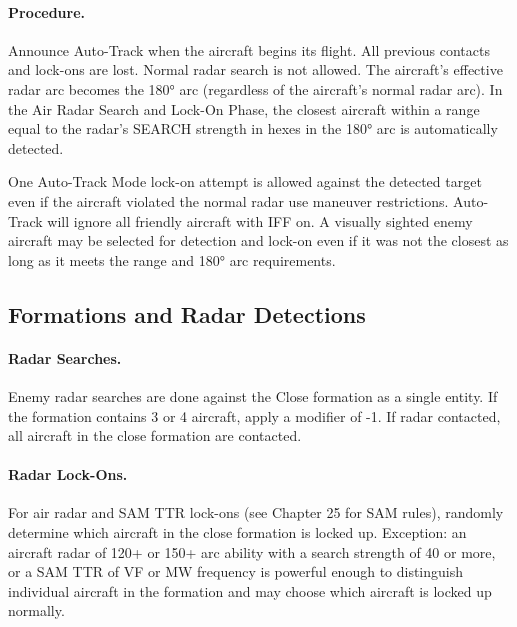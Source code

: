 \paragraph{Procedure.} Announce Auto-Track when the aircraft begins its flight. All previous contacts and lock-ons are lost. Normal radar search is not allowed. The aircraft's effective radar arc becomes the 180° arc (regardless of the aircraft's normal radar arc). In the Air Radar Search and Lock-On Phase, the closest aircraft within a range equal to the radar's SEARCH strength in hexes in the 180° arc is automatically detected.

One Auto-Track Mode lock-on attempt is allowed against the detected target even if the aircraft violated the normal radar use maneuver restrictions. Auto-Track will ignore all friendly aircraft with IFF on. A visually sighted enemy aircraft may be selected for detection and lock-on even if it was not the closest as long as it meets the range and 180° arc requirements. 


\subsection{Formations and Radar Detections}

\paragraph{Radar Searches.} Enemy radar searches are done against the Close formation as a single entity. If the formation contains 3 or 4 aircraft, apply a modifier of -1. If radar contacted, all aircraft in the close formation are contacted.

\paragraph{Radar Lock-Ons.} For air radar and SAM TTR lock-ons (see Chapter 25 for SAM rules), randomly determine which aircraft in the close formation is locked up. Exception: an aircraft radar of 120+ or 150+ arc ability with a search strength of 40 or more, or a SAM TTR of VF or MW frequency is powerful enough to distinguish individual aircraft in the formation and may choose which aircraft is locked up normally.
